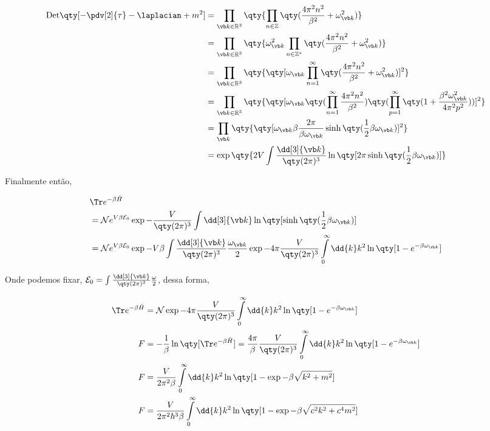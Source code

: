 \documentclass[twoside]{amsart}
\numberwithin{equation}{section}
\newcommand{\Det}[1]{\textup{Det} #1}
\begin{document}
\begin{refsection}
\begin{align}
     \Det\qty[-\pdv[2]{\tau}-\laplacian+m^2] &=\prod\limits_{\vb k\in\mathbb R^3}\qty{\prod\limits_{n\in\mathbb Z}\qty(\frac{4\pi^2n^2}{\beta^2}+\omega_{\vb k}^2)}\\
     &=\prod\limits_{\vb k\in\mathbb R^3}\qty{\omega_{\vb k}^2\prod\limits_{n\in\mathbb Z^\ast}\qty(\frac{4\pi^2n^2}{\beta^2}+\omega_{\vb k}^2)}\\
     &=\prod\limits_{\vb k\in\mathbb R^3}\qty{\qty[\omega_{\vb k}\prod\limits_{n=1}^{\infty}\qty(\frac{4\pi^2n^2}{\beta^2}+\omega_{\vb k}^2)]^2}\\
     &=\prod\limits_{\vb k\in\mathbb R^3}\qty{\qty[\omega_{\vb k}\qty(\prod\limits_{n=1}^{\infty}\frac{4\pi^2n^2}{\beta^2})\qty(\prod\limits_{p=1}^{\infty}\qty(1+\frac{\beta^2\omega_{\vb k}^2}{4\pi^2p^2}))]^2}\\
     &=\prod\limits_{\vb k}\qty{\qty[\omega_{\vb k}\beta\frac{2\pi}{\beta\omega_{\vb k}}\sinh\qty(\frac12\beta\omega_{\vb k})]^2}\\
     &=\exp\qty{2V\int\frac{\dd[3]{\vb k}}{\qty(2\pi)^3}\ln\qty[2\pi\sinh\qty(\frac12\beta\omega_{\vb k})]}
\end{align}

Finalmente então,

\begin{align}
    &\Tr e^{-\beta\hat H}\\
    &=\mathcal Ne^{V\beta\mathcal E_0}\exp{-\frac{V}{\qty(2\pi)^3}\int\dd[3]{\vb k}\ln\qty[\sinh\qty(\frac12\beta\omega_{\vb k})]}\\
    &=\mathcal Ne^{V\beta\mathcal E_0}\exp{-V\beta\int\frac{\dd[3]{\vb k}}{\qty(2\pi)^3}\frac{\omega_{\vb k}}{2}}\exp{-4\pi\frac{V}{\qty(2\pi)^3}\int\limits_0^\infty\dd{ k}k^2\ln\qty[1-e^{-\beta\omega_{\vb k}}]}
\end{align}

Onde podemos fixar, $\mathcal E_0=\int\frac{\dd[3]{\vb k}}{\qty(2\pi)^3}\frac\omega2$, dessa forma,

\begin{align}
    \Tr e^{-\beta\hat H}&=\mathcal N\exp{-4\pi\frac{V}{\qty(2\pi)^3}\int\limits_0^\infty\dd{ k}k^2\ln\qty[1-e^{-\beta\omega_{\vb k}}]}\\
    F&=-\frac1\beta\ln\qty[\Tr e^{-\beta\hat H}]=\frac{4\pi}{\beta}\frac{V}{\qty(2\pi)^3}\int\limits_0^\infty\dd{ k}k^2\ln\qty[1-e^{-\beta\omega_{\vb k}}]\\
    F&=\frac{V}{2\pi^2\beta}\int\limits_0^\infty\dd{ k}k^2\ln\qty[1-\exp{-\beta\sqrt{k^2+m^2}}]\\
    F&=\frac{V}{2\pi^2\hbar^3\beta}\int\limits_0^\infty\dd{ k}k^2\ln\qty[1-\exp{-\beta\sqrt{c^2k^2+c^4m^2}}]
\end{align}


\end{refsection}
\end{document}
